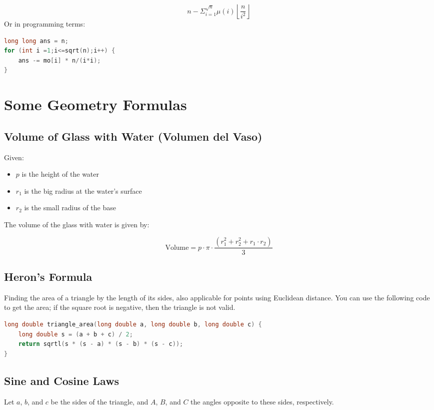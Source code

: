 \documentclass[a4paper,landscape]{article} %
\begin{document}
\begin{multicols}{3}
$$ n - \Sigma^{\sqrt{n}}_{i=1} \mu(i)\left\lfloor \frac{n}{i^2} \right\rfloor $$ 
\newline
Or in programming terms:

\begin{lstlisting}[language=C++, frame=None]
long long ans = n;
for (int i =1;i<=sqrt(n);i++) {
    ans -= mo[i] * n/(i*i);
}
\end{lstlisting}




\section*{Some Geometry Formulas}
\subsection*{Volume of Glass with Water (Volumen del Vaso)}
Given:
\begin{itemize}
    \item \( p \) is the height of the water
    \item \( r_1 \) is the big radius at the water's surface
    \item \( r_2 \) is the small radius of the base
\end{itemize}

The volume of the glass with water is given by:

\[
\text{Volume} = p \cdot \pi \cdot \frac{ \left( r_1^2 + r_2^2 + r_1 \cdot r_2 \right)}{3}
\]

\subsection*{Heron's Formula}
Finding the area of a triangle by the length of its sides, also applicable for points using Euclidean distance. You can use the following code to get the area; if the square root is negative, then the triangle is not valid.

\begin{lstlisting}[language=C++, frame=None]
long double triangle_area(long double a, long double b, long double c) {
    long double s = (a + b + c) / 2;
    return sqrtl(s * (s - a) * (s - b) * (s - c));
}
\end{lstlisting}

\subsection*{Sine and Cosine Laws}
Let \( a \), \( b \), and \( c \) be the sides of the triangle, and \( A \), \( B \), and \( C \) the angles opposite to these sides, respectively.


\end{multicols}
\end{document}
